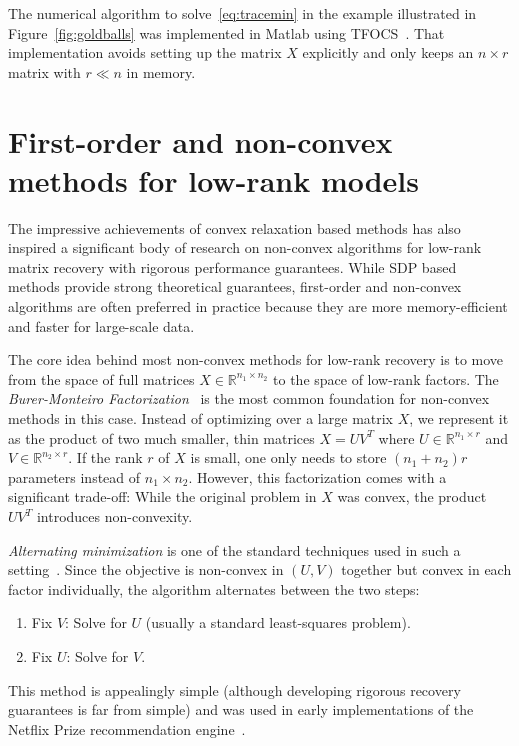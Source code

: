 The numerical algorithm to solve~\eqref{eq:tracemin} in the example illustrated in Figure~\ref{fig:goldballs} was implemented in Matlab using TFOCS~\cite{becker2011templates}. That implementation avoids setting up the matrix $X$ explicitly and only keeps an $n\times r$ matrix with $r \ll n$ in memory.




\section{First-order and non-convex methods for low-rank models}
\label{s:nonconvexmodels}

The impressive achievements of convex relaxation based methods has also inspired a significant body of research on
non-convex algorithms for low-rank matrix recovery with rigorous performance guarantees.
While SDP based methods provide strong theoretical guarantees, first-order and non-convex algorithms are often preferred in practice because they are more memory-efficient and faster for large-scale data.

The core idea behind most non-convex methods for low-rank recovery is to move from the space of full matrices $X \in \mathbb{R}^{n_1 \times n_2}$ to the space of low-rank factors.
The {\em Burer-Monteiro Factorization}~\cite{burer2003nonlinear} is the most common foundation for non-convex methods in this case. Instead of optimizing over a large matrix $X$, we represent it as the product of two much smaller, thin matrices $X = UV^T$
where $U \in \mathbb{R}^{n_1 \times r}$ and $V \in \mathbb{R}^{n_2 \times r}$. If the rank $r$ of $X$ is small, one only needs to store $(n_1 + n_2)r$ parameters instead of $n_1 \times n_2$. However, this factorization comes with a significant trade-off: While the original problem in $X$ was convex, the product $UV^T$ introduces non-convexity.

{\em Alternating minimization} is one of the standard techniques used in such a setting~\cite{jain2013low,keshavan2010matrix}.  Since the objective is non-convex in $(U, V)$ together but convex in each factor individually, the algorithm alternates between the two steps:
\begin{enumerate}
\setlength{\itemsep}{0.8pt}
\item  Fix $V$: Solve for $U$ (usually a standard least-squares problem).
\item Fix $U$: Solve for $V$.
\end{enumerate}
This method is appealingly simple (although developing rigorous recovery guarantees is far from simple) and was used in early implementations of the Netflix Prize recommendation engine~\cite{zhou2008large}.

